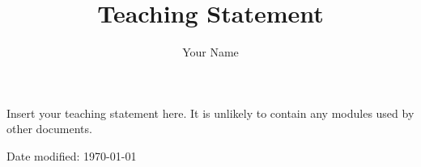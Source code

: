 \documentclass[12pt]{article}
\title{Teaching Statement}
\author{Your Name}
\date{} %
\begin{document}
\maketitle

Insert your teaching statement here. 
It is unlikely to contain any modules used by
other documents.

\vfill
\centering Date modified: \today
\end{document}
